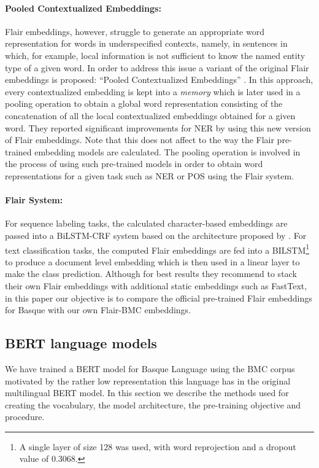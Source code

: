 \documentclass[10pt, a4paper]{article}
\begin{document}
\paragraph{Pooled Contextualized Embeddings:} Flair embeddings, however, struggle to generate an appropriate word representation for words in underspecified contexts, namely, in sentences in which, for example, local information is not sufficient to know the named entity type of a given word. In order to address this issue a variant of the original Flair embeddings is proposed: ``Pooled Contextualized Embeddings'' \cite{akbik2019naacl}. In this approach, every contextualized embedding is kept into a \emph{memory} which is later used in a pooling operation to obtain a global word representation consisting of the concatenation of all the local contextualized embeddings obtained for a given word. They reported significant improvements for NER by using this new version of Flair embeddings. Note that this does not affect to the way the Flair pre-trained embedding models are calculated. The pooling operation is involved in the process of using such pre-trained models in order to obtain word representations for a given task such as NER or POS using the Flair system.

\paragraph{Flair System:} For sequence labeling tasks, the calculated character-based embeddings are passed into a BiLSTM-CRF system based on the architecture proposed by \cite{huang2015bidirectional}. For text classification tasks, the computed Flair embeddings are fed into a BILSTM\footnote{A single layer of size 128 was used, with word reprojection and a dropout value of 0.3068.} to produce a document level embedding which is then used in a linear layer to make the class prediction. Although for best results they recommend to stack their own Flair embeddings with additional static embeddings such as FastText, in this paper our objective is to compare the official pre-trained Flair embeddings for Basque with our own Flair-BMC embeddings.

\subsection{BERT language models}\label{sec:build-basq-models:bert}

We have trained a BERT \cite{devlin2019bert} model for Basque Language using the BMC corpus motivated by the rather low representation this language has in the original multilingual BERT model. In this section we describe the methods used for creating the vocabulary, the model architecture, the pre-training objective and procedure.
\end{document}
